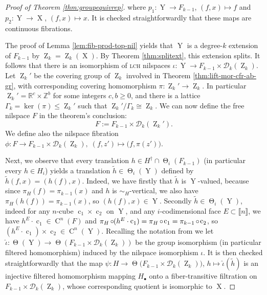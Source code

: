 \documentclass[a4paper,12pt,reqno]{amsart}
\newcommand*{\compl}[1]{#1^\dagger}
\theoremstyle{definition}
\def\to{\rightarrow}
\newcommand*{\db}[1]{\llbracket #1\rrbracket}
\newcommand{\mc}{\mathcal}
\newcommand{\mb}{\mathbb}
\DeclareMathOperator{\ab}{Z}
\DeclareMathOperator{\tran}{\Theta}
\DeclareMathOperator{\q}{c}
\DeclareMathOperator{\ns}{X}
\DeclareMathOperator{\nss}{Y}
\DeclareMathOperator{\co}{\circ\hspace{-0.02 cm}}
\DeclareMathOperator{\cu}{C}
\begin{document}
\begin{proof}[Proof of Theorem \ref{thm:groupequivrep}]
\vspace{-0.3cm}

\noindent where $p_1:\nss\to F_{k-1}$, $(f,x)\mapsto f$ and $p_2:\nss\to \ns$, $(f,x)\mapsto x$. It is checked straightforwardly that these maps are continuous fibrations.

The proof of Lemma \ref{lem:fib-prod-top-nil}  yields that $\nss$ is a degree-$k$ extension of $F_{k-1}$ by $\ab_k=\ab_k(\ns)$. By Theorem \ref{thm:splitext}, this extension splits. It follows that there is an isomorphism of \textsc{lch}  nilspaces $\iota:\nss\to F_{k-1}\times \mc{D}_k(\ab_k)$. Let $\ab_k'$ be the covering group of $\ab_k$ involved in Theorem \ref{thm:lift-mor-cfr-ab-gr}, with corresponding covering homomorphism $\pi:\ab_k'\to \ab_k$. In particular $\ab_k'=\mb{R}^c\times \mb{Z}^b$ for some integers $c,b\ge 0$, and there is a lattice $\Gamma_k=\ker(\pi)\leq \ab_k'$ such that $\ab_k'/\Gamma_k\cong \ab_k$. We can now define the free nilspace $F$ in the theorem's conclusion:
\begin{equation}
F:=  F_{k-1}\times \mc{D}_k(\ab_k'). 
\end{equation}
We define also the nilspace fibration
$\phi:F \to F_{k-1}\times \mc{D}_k(\ab_k), \; (f,z')\mapsto \big(f,\pi(z')\big)$.

Next, we observe that every translation $h\in \compl{H}\cap \tran_i(F_{k-1})$ (in particular every $h\in H_i$) yields a translation $\tilde{h}\in \tran_i(\nss)$ defined by
$\tilde{h}(f,x) = (h(f),x)$. Indeed, we have firstly that $\tilde{h}$ is $\nss$-valued, because since $\pi_H(f)=\pi_{k-1}(x)$ and $h$ is $\sim_{H}$-vertical, we also have $\pi_{H}(h(f))=\pi_{k-1}(x)$, so $ (h(f),x)\in \nss$. Secondly $\tilde{h}\in \tran_i(\nss)$, indeed for any $n$-cube $\q_1\times\q_2$ on $\nss$, and any $i$-codimensional face $E \subset \db{n}$, we have $h^{E}\cdot \q_1\in \cu^n(F)$ and $\pi_H\co (h^{E}\cdot \q_1) =\pi_H\co \q_1=\pi_{k-1}\co \q_2$, so  $(h^{E}\cdot \q_1)\times\q_2\in \cu^n(\nss)$. Recalling the notation from \cite[Lemma 1.5]{CGSS} we let $\widehat{\iota}:\tran(\nss)\to \tran(F_{k-1}\times \mc{D}_k(\ab_k))$ be the group isomorphism (in particular filtered homomorphism) induced by the nilspace isomorphism $\iota$. It is then checked straightforwardly that the map $\psi:H\to \tran\big(F_{k-1}\times \mc{D}_k(\ab_k)\big)$, $h\mapsto \widehat{\iota}(\tilde h)$ is an injective filtered homomorphism mapping $H_\bullet$ onto a fiber-transitive filtration on $F_{k-1}\times \mc{D}_k(\ab_k)$, whose corresponding quotient is isomorphic to $\ns$. 


\end{proof}
\end{document}
